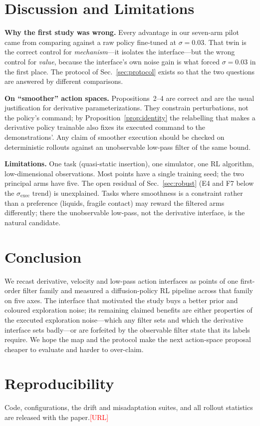 \documentclass[conference]{IEEEtran}
\newcommand{\sexec}{\sigma_{\mathrm{exec}}}
\newcommand{\todo}[1]{\textcolor{red}{[#1]}}
\begin{document}
\section{Discussion and Limitations}

\textbf{Why the first study was wrong.} Every advantage in our seven-arm pilot came from comparing against a raw policy fine-tuned at $\sigma=0.03$. That twin is the correct control for \emph{mechanism}---it isolates the interface---but the wrong control for \emph{value}, because the interface's own noise gain is what forced $\sigma=0.03$ in the first place. The protocol of Sec.~\ref{sec:protocol} exists so that the two questions are answered by different comparisons.

\textbf{On ``smoother'' action spaces.} Propositions~2--4 are correct and are the usual justification for derivative parameterizations. They constrain perturbations, not the policy's command; by Proposition~\ref{prop:identity} the relabelling that makes a derivative policy trainable also fixes its executed command to the demonstrations'. Any claim of smoother execution should be checked on deterministic rollouts against an unobservable low-pass filter of the same bound.

\textbf{Limitations.} One task (quasi-static insertion), one simulator, one RL algorithm, low-dimensional observations. Most points have a single training seed; the two principal arms have five. The open residual of Sec.~\ref{sec:robust} (E4 and F7 below the $\sexec$ trend) is unexplained. Tasks where smoothness is a constraint rather than a preference (liquids, fragile contact) may reward the filtered arms differently; there the unobservable low-pass, not the derivative interface, is the natural candidate.

\section{Conclusion}

We recast derivative, velocity and low-pass action interfaces as points of one first-order filter family and measured a diffusion-policy RL pipeline across that family on five axes. The interface that motivated the study buys a better prior and coloured exploration noise; its remaining claimed benefits are either properties of the executed exploration noise---which any filter sets and which the derivative interface sets badly---or are forfeited by the observable filter state that its labels require. We hope the map and the protocol make the next action-space proposal cheaper to evaluate and harder to over-claim.

\section*{Reproducibility}
Code, configurations, the drift and misadaptation suites, and all rollout statistics are released with the paper.\todo{URL}



\end{document}
